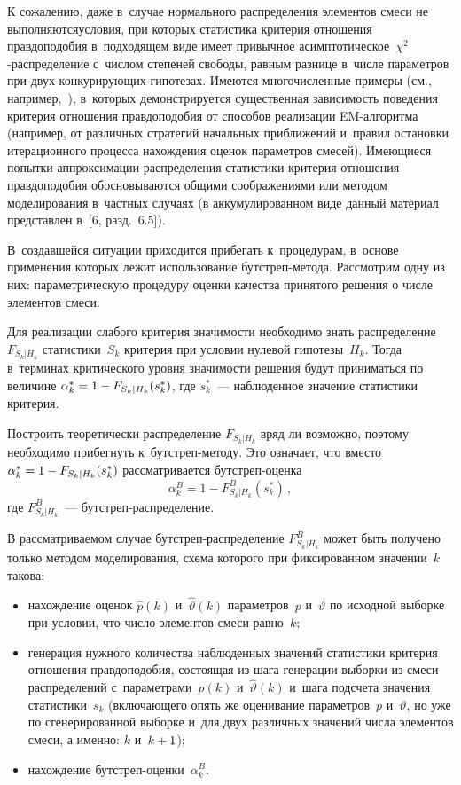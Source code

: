 \begin{multicols}{2}
     К сожалению, даже в~случае нормального распределения элементов смеси
не выполняются\linebreak условия, при которых статистика критерия отношения
правдоподобия в~подходящем виде имеет привычное
асимптотическое~$\chi^2$-рас\-пре\-де\-ле\-ние с~чис\-лом степеней свободы,
равным разнице в~чис\-ле па\-ра\-мет\-ров при двух конкурирующих гипотезах.
Имеются многочисленные примеры (см., например,~\cite{11-kri}), в~которых
демонстрируется существенная зависимость поведения критерия отношения\linebreak
правдоподобия от способов реализации EM-ал\-горитма (например, от
различных стратегий начальных приближений и~правил остановки
итерационного процесса %
 нахождения оценок параметров смесей). Име\-ющи\-еся
попытки аппроксимации распределения статистики критерия отношения
правдоподобия обосно\-вы\-ва\-ют\-ся общими соображениями или методом
моделирования в~частных случаях (в аккумулированном виде данный материал
представлен в~[6, разд.~6.5]).

В~создавшейся ситуации приходится
прибегать к~процедурам, в~основе применения которых лежит использование
бут\-стреп-ме\-то\-да. Рассмотрим одну из них: параметрическую процедуру
оценки качества принятого решения о числе элементов смеси.

     Для реализации слабого критерия значимости необходимо знать
распределение $F_{S_k\vert H_k}$ статистики~$S_k$ критерия при условии
нулевой гипотезы~$H_k$. Тогда в~терминах критического уровня зна\-чи\-мости
решения будут приниматься по величине $\alpha_k^*\hm= 1-F_{S_k\vert
H_k}(s_k^*)$, где $s_k^*$~--- наблюденное значение статистики критерия.

     Построить теоретически распределение $F_{S_k\vert H_k}$ вряд ли
возможно, поэтому необходимо прибегнуть к~бут\-стреп-ме\-то\-ду. Это
означает, что вместо $\alpha_k^*\hm= 1-F_{S_k\vert H_k}(s_k^*)$
рассматривается бут\-стреп-оцен\-ка
     $$
     \alpha_k^B=1-F^B_{S_k\vert H_k}(s_k^*)\,,
     $$
где $F^B_{S_k\vert H_k}$~--- бут\-стреп-рас\-пре\-де\-ление.

     В рассматриваемом случае бут\-стреп-рас\-пре\-де\-ле\-ние
$F^B_{S_k\vert H_k}$ может быть получено только методом моделирования,
схема которого при фиксированном значении~$k$ такова:
     \begin{itemize}
\item нахождение оценок $\hat{p}(k)$ и~$\hat{\vartheta}(k)$
параметров~$p$ и~$\vartheta$ по исходной выборке при условии, что число элементов смеси
равно~$k$;
\item генерация нужного количества наблюденных значений статистики
критерия отношения правдоподобия, состоящая из шага генерации выборки
из смеси распределений с~параметрами~$\hat{p}(k)$ и~$\hat{\vartheta}(k)$ и~шага
подсчета значения статистики~$s_k$ (включающего опять же оценивание
параметров~$p$ и~$\vartheta$, но уже по сгенерированной выборке и~для двух
различных значений числа элементов смеси, а именно: $k$ и~$k\hm+1$);
\item нахождение бут\-стреп-оцен\-ки~$\alpha_k^B$.
\end{itemize}


\end{multicols}
